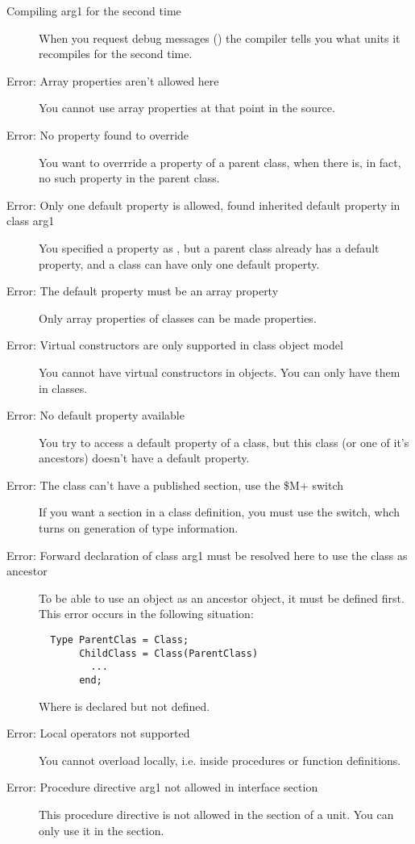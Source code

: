 \begin{description}
\item [Compiling arg1 for the second time]
 When you request debug messages () the compiler tells you what
 units it recompiles for the second time.
\item [Error: Array properties aren't allowed here]
 You cannot use array properties at that point in the source.
\item [Error: No property found to override]
 You want to overrride a property of a parent class, when there is, in fact,
 no such property in the parent class.
\item [Error: Only one default property is allowed, found inherited default property in class arg1]
 You specified a property as , but a parent class already has a
 default property, and a class can have only one default property.
\item [Error: The default property must be an array property]
 Only array properties of classes can be made  properties.
\item [Error: Virtual constructors are only supported in class object model]
 You cannot have virtual constructors in objects. You can only have them
 in classes.
\item [Error: No default property available]
 You try to access a default property of a class, but this class (or one of
 it's ancestors) doesn't have a default property.
\item [Error: The class can't have a published section, use the {\$M+} switch]
 If you want a  section in a class definition, you must
 use the  switch, whch turns on generation of type
 information.
\item [Error: Forward declaration of class arg1 must be resolved here to use the class as ancestor]
 To be able to use an object as an ancestor object, it must be defined
 first. This error occurs in the following situation:
 \begin{verbatim}
  Type ParentClas = Class;
       ChildClass = Class(ParentClass)
         ...
       end;
 \end{verbatim}
 Where  is declared but not defined.
\item [Error: Local operators not supported]
 You cannot overload locally, i.e. inside procedures or function
 definitions.
\item [Error: Procedure directive arg1 not allowed in interface section]
 This procedure directive is not allowed in the  section of
 a unit. You can only use it in the  section.

\end{description}
